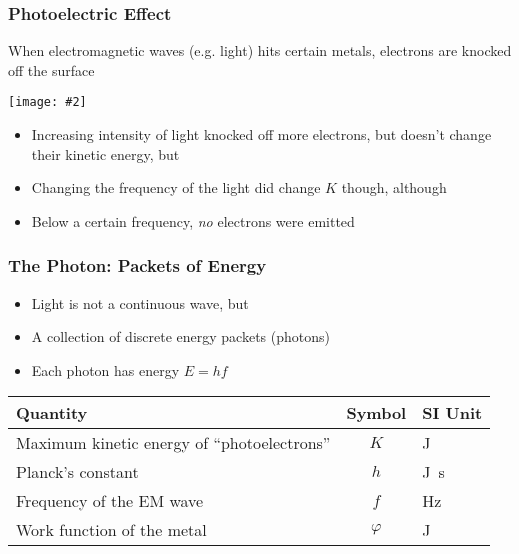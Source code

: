 \documentclass[12pt,compress,aspectratio=169]{beamer}
\newcommand{\pic}[2]{\texttt{[image: \#2]}}
\begin{document}
\begin{frame}
  \frametitle{Photoelectric Effect}
  When electromagnetic waves (e.g. light) hits certain metals, electrons are
  knocked off the surface

  \pic{1}{73bacc9f2bf571752483a89ef6c61a94f07470f7.png}
  \begin{itemize}
  \item Increasing intensity of light knocked off more electrons, but doesn't
    change their kinetic energy, but
  \item Changing the frequency of the light did change $K$ though, although
  \item Below a certain frequency, \emph{no} electrons were emitted
  \end{itemize}
\end{frame}


\begin{frame}
  \frametitle{The Photon: Packets of Energy}
  \begin{itemize}
  \item Light is not a continuous wave, but
  \item A collection of discrete energy packets (photons)
  \item Each photon has energy $E=hf$
  \end{itemize}

  \begin{center}
    \begin{tabular}{l|c|l}
      \rowcolor{pink}
      \textbf{Quantity} & \textbf{Symbol} & \textbf{SI Unit} \\ \hline
      Maximum kinetic energy of ``photoelectrons'' & $K$ & \si{\joule}\\
      Planck's constant           & $h$   & \si{\joule.\second}\\
      Frequency of the EM wave    & $f$   & \si{\hertz}\\
      Work function of the metal  & $\varphi$ & \si{\joule}
    \end{tabular}
  \end{center}
\end{frame}
\end{document}
